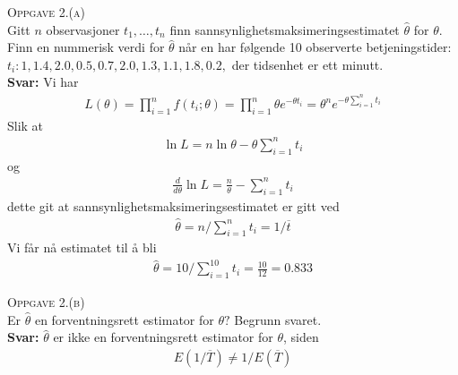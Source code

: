 \documentclass{article}
\begin{document}
\textsc{Oppgave 2.(a)}\\
Gitt $n$ observasjoner $t_1,\ldots, t_n$ finn
sannsynlighetsmaksimeringsestimatet $\hat{\theta}$ for $\theta.$ Finn en
nummerisk verdi for $\hat{\theta}$ når en har følgende 10 observerte
betjeningstider: $t_i: 1, 1.4, 2.0, 0.5, 0.7, 2.0, 1.3, 1.1, 1.8, 0.2,$ der
tidsenhet er ett minutt.\\
\textbf{Svar:} Vi har
\begin{align*}
  L(\theta)=\prod_{i=1}^{n} f(t_i ; \theta)=\prod_{i=1}^{n}\theta e^{-\theta t_i}=\theta^n e^{-\theta \sum_{i=1}^{n} t_i}
\end{align*}
Slik at
\begin{align*}
  \ln{L}=n \ln{\theta}-\theta \sum_{i=1}^{n}t_i
\end{align*}
og
\begin{align*}
  \frac{d}{d\theta}\ln{L}=\frac{n}{\theta}- \sum_{i=1}^{n} t_i
\end{align*}
dette git at sannsynlighetsmaksimeringsestimatet er gitt ved
\begin{align*}
  \hat{\theta}=n/\sum_{i=1}^{n}t_i=1/\overline{t}
\end{align*}
Vi får nå estimatet til å bli
\begin{align*}
  \hat{\theta} = 10/\sum_{i=1}^{10}t_i =\frac{10}{12}=0.833 
\end{align*}

\textsc{Oppgave 2.(b)}\\
Er $\hat{\theta}$ en forventningsrett estimator for $\theta?$ Begrunn svaret.\\
\textbf{Svar:} $\hat{\theta}$ er ikke en forventningsrett estimator for
$\theta$, siden
\begin{align*}
  E\left(1 / \overline{T} \right)\ne 1 / E\left( \overline{T} \right)
\end{align*}
  
\end{document}
